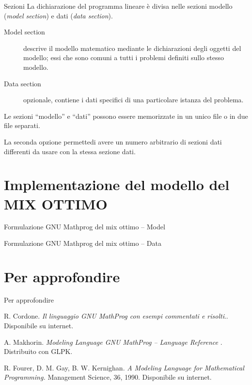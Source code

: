 \documentclass{beamer}
\begin{document}
\begin{frame}{Sezioni}
La dichiarazione del programma lineare \`e divisa nelle sezioni modello
(\emph{model section}) e dati (\emph{data section}).

\begin{description}
\item [{Model section}] descrive il modello matematico mediante
le dichiarazioni degli oggetti del modello; essi che sono comuni a
tutti i problemi definiti sullo stesso modello.
\item [{Data section}] opzionale, contiene i dati specifici di una
particolare istanza del problema.
\end{description}

Le sezioni ``modello'' e ``dati'' possono essere memorizzate in un
unico file o in due file separati.

La seconda opzione permettedi avere un numero arbitrario di sezioni
dati differenti da usare con la stessa sezione dati.
\end{frame}

\section{Implementazione del modello del MIX OTTIMO}

\begin{frame}{Formulazione GNU Mathprog del mix ottimo -- Model}

\end{frame}

\begin{frame}{Formulazione GNU Mathprog del mix ottimo -- Data}

\end{frame}

\section{Per approfondire}

\begin{frame}{Per approfondire}

\beamertemplatebookbibitems
\begin{thebibliography}{References}
R. Cordone.\newblock
\textit{Il linguaggio GNU MathProg con esempi commentati e risolti}.. Disponibile su internet.

 A. Makhorin.\newblock
\textit{Modeling Language GNU MathProg -- Language Reference}
. Distribuito con GLPK.

 R. Fourer, D. M. Gay, B. W. Kernighan.%
\newblock \emph{A Modeling Language for Mathematical Programming.}%
\newblock Management Science, 36, 1990. Disponibile su internet.
\end{thebibliography}
\end{frame}
\end{document}
